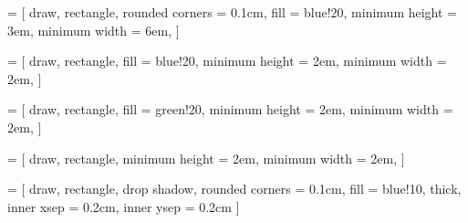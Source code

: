  =
[
	draw,
	rectangle,
	rounded corners	= 0.1cm,
	fill			= blue!20,
	minimum height	= 3em,
	minimum width   = 6em,
]

 =
[
	draw,
	rectangle,
	fill			= blue!20,
	minimum height	= 2em,
	minimum width	= 2em,
]

 =
[
	draw,
	rectangle,
	fill			= green!20,
	minimum height	= 2em,
	minimum width	= 2em,
]

 =
[
	draw,
	rectangle,
	minimum height	= 2em,
	minimum width	= 2em,
]

 =
[
	draw,
	rectangle,
	drop shadow,
	rounded corners	= 0.1cm,
	fill			= blue!10,
	thick,
	inner xsep		= 0.2cm,		%
	inner ysep		= 0.2cm 		%
]
